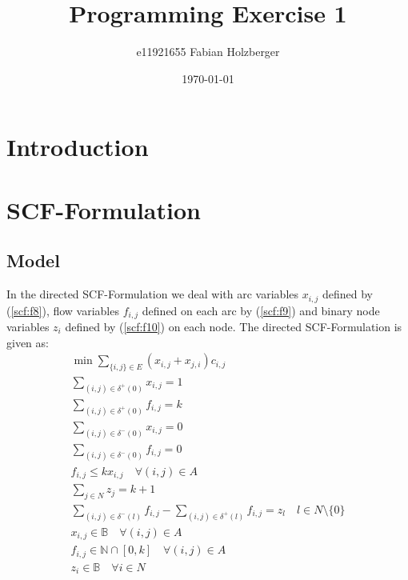 \documentclass[11pt]{article}
\title{Programming Exercise 1}
\author{e11921655 Fabian Holzberger}
\date{\today}
\begin{document}
\graphicspath{{./figures/}}
\maketitle

%
\section{Introduction}

\section{SCF-Formulation}
\subsection{Model}
In the directed SCF-Formulation we deal with arc variables $x_{i,j}$ defined by (\ref{scf:f8}), flow variables $f_{i,j}$ defined on each arc by (\ref{scf:f9}) and binary node variables $z_i$ defined by (\ref{scf:f10}) on each node. The directed SCF-Formulation is given as:
\begin{gather}
  \min\sum\limits_{\{i,j\}\in E}(x_{i,j}+ x_{j,i})c_{i,j} \label{scf:f0}\\
  \sum\limits_{(i,j)\in \delta^+(0) } x_{i,j} =1 \label{scf:f1}\\
  \sum\limits_{(i,j)\in \delta^+(0) } f_{i,j} =k \label{scf:f2}\\
  \sum\limits_{(i,j)\in \delta^-(0) } x_{i,j} =0 \label{scf:f3}\\
  \sum\limits_{(i,j)\in \delta^-(0) } f_{i,j} =0 \label{scf:f4}\\
  f_{i,j} \leq kx_{i,j} \quad \forall (i,j)\in A\label{scf:f5}\\
  \sum\limits_{j\in N} z_j = k+1\label{scf:f6}\\
  \sum\limits_{(i,j)\in \delta^-(l) } f_{i,j} - \sum\limits_{(i,j)\in \delta^+(l) } f_{i,j} = z_l \quad l\in N \setminus \{0\}\label{scf:f7}\\
  x_{i,j} \in \mathbb{B} \quad \forall (i,j)\in A\label{scf:f8}\\
  f_{i,j} \in \mathbb{N}\cap[0,k] \quad \forall (i,j)\in A\label{scf:f9}\\
  z_{i} \in \mathbb{B} \quad \forall i \in N\label{scf:f10}\\
\end{gather}
\end{document}
